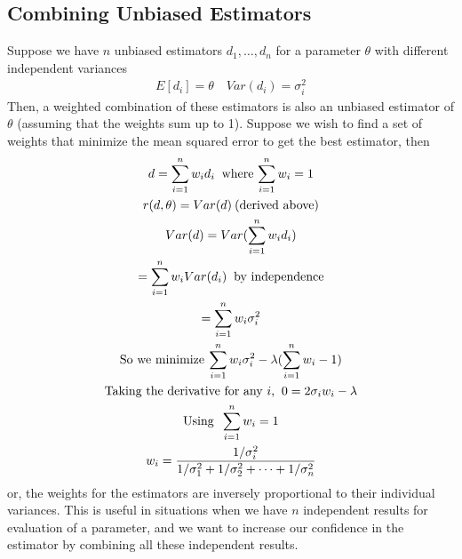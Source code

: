 \documentclass[../probability-notes.tex]{subfiles}
\begin{document}
    \subsection{Combining Unbiased Estimators}
    Suppose we have $n$ unbiased estimators $d_{1}, \ldots, d_{n}$ for a parameter $\theta$ with different independent variances
    \begin{align*}
        E[d_{i}] = \theta \quad Var(d_{i}) = \sigma_{i}^{2}
    \end{align*}
    Then, a weighted combination of these estimators is also an unbiased estimator of $\theta$ (assuming that the weights sum up to 1). Suppose we wish to find a set of weights that minimize the mean squared error to get the best estimator, then
    \begin{gather*}
        d = \sum_{i=1}^{n} w_{i} d_{i} \text{\: where $\sum_{i=1}^{n} w_{i} = 1$}\\
        r(d, \theta) = Var(d) \text{\:(derived above)}\\
        Var(d) = Var(\sum_{i=1}^{n} w_{i} d_{i})\\
        = \sum_{i=1}^{n}w_{i} Var(d_{i}) \text{\: by independence}\\
        = \sum_{i=1}^{n}w_{i} \sigma_{i}^{2}\\
        \text{So we minimize\:} \sum_{i=1}^{n}w_{i} \sigma_{i}^{2} - \lambda(\sum_{i=1}^{n} w_{i}-1)\\
        \text{Taking the derivative for any $i$, \:} 0 = 2\sigma_{i} w_{i} - \lambda\\
        \text{Using \:}\sum_{i=1}^{n} w_{i} = 1\\
        w_{i} = \frac{1/\sigma_{i}^{2}}{1/\sigma_{1}^{2} + 1/\sigma_{2}^{2} + \cdots + 1/\sigma_{n}^{2}}
    \end{gather*}
    or, the weights for the estimators are inversely proportional to their individual variances. This is useful in situations when we have $n$ independent results for evaluation of a parameter, and we want to increase our confidence in the estimator by combining all these independent results.\newline


\end{document}
